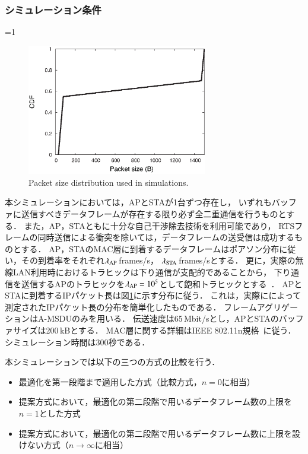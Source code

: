 \documentclass[master]{kuisthesis}		%
\newcounter{flagFig}
\begin{document}
		\subsubsection{シミュレーション条件}
			\ifnum\value{flagFig}=1 {\begin{figure}[htbp]
				\begin{center}
					\includegraphics[width=0.7\textwidth]{graph/traffic.eps}
					\caption{Packet size distribution used in simulations.}
					\label{fig:traffic}
				\end{center}
			\end{figure}}\fi
			本シミュレーションにおいては，APとSTAが1台ずつ存在し，
			いずれもバッファに送信すべきデータフレームが存在する限り必ず全二重通信を行うものとする．
			また，AP，STAともに十分な自己干渉除去技術を利用可能であり，
			RTSフレームの同時送信による衝突を除いては，データフレームの送受信は成功するものとする．
			AP，STAのMAC層に到着するデータフレームはポアソン分布に従い，その到着率をそれぞれ$\lambda_{\rm{AP}}$\,frames/s，
			$\lambda_{\rm{STA}}$\,frames/sとする．
			更に，実際の無線LAN利用時におけるトラヒックは下り通信が支配的であることから，
			下り通信を送信するAPのトラヒックを$\lambda_{\rm{AP}}=10^{5}$として飽和トラヒックとする~\cite{traffic}．
			APとSTAに到着するIPパケット長は図\ref{fig:traffic}に示す分布に従う．
			これは，実際に\cite{traffic}によって測定されたIPパケット長の分布を簡単化したものである．
			フレームアグリゲーションはA-MSDUのみを用いる．
			伝送速度は65\,Mbit/sとし，APとSTAのバッファサイズは200\,kBとする．
			MAC層に関する詳細はIEEE 802.11n規格~\cite{stdn}に従う．
			シミュレーション時間は300秒である．
			\par
			本シミュレーションでは以下の三つの方式の比較を行う．
			\begin{itemize}
				\item 最適化を第一段階まで適用した方式（比較方式，$n=0$に相当）
				\item 提案方式において，最適化の第二段階で用いるデータフレーム数の上限を$n=1$とした方式
				\item 提案方式において，最適化の第二段階で用いるデータフレーム数に上限を設けない方式（$n\to\infty$に相当）
			\end{itemize}
\end{document}
